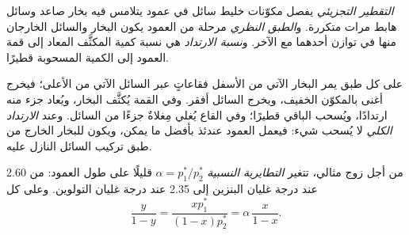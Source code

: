 \begin{definition}\label{def:b2:liquid-vapour-diagrams:fractional-distillation}
\emph{التقطير التجزيئي} يفصل
مكوّنات خليط سائل في عمود يتلامس فيه بخار صاعد وسائل
هابط مرات متكررة. و\emph{الطبق النظري}
مرحلة من العمود يكون البخار والسائل الخارجان منها في توازن
أحدهما مع الآخر. و\emph{نسبة الارتداد} هي نسبة كمية
المكثَّف المعاد إلى قمة العمود إلى الكمية المسحوبة قطيرًا.
\end{definition}

على كل طبق يمر البخار الآتي من الأسفل فقاعاتٍ عبر السائل الآتي من الأعلى؛ فيخرج
أغنى بالمكوّن الخفيف، ويخرج السائل أفقر. وفي القمة يُكثَّف البخار،
ويُعاد جزء منه ارتدادًا، ويُسحب الباقي
قطيرًا؛ وفي القاع يُغلي مِغلاةٌ جزءًا من السائل. وعند
\textit{الارتداد الكلي} لا يُسحب شيء: فيعمل العمود عندئذ بأفضل ما يمكن،
ويكون للبخار الخارج من طبق تركيب السائل النازل
عليه.


من أجل زوج مثالي، تتغير \textit{التطايرية النسبية} $\alpha = p_1^*/p_2^*$
قليلًا على طول العمود: من 2.60 عند درجة غليان البنزين إلى
2.35 عند درجة غليان التولوين. وعلى كل 
\[
  \frac{y}{1 - y} = \frac{xp_1^*}{(1 - x)p_2^*} = \alpha\,\frac{x}{1 - x} .
\]

